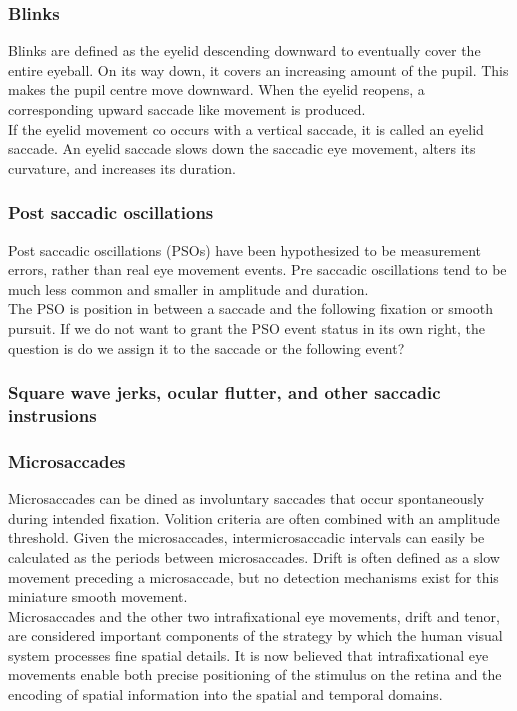 \documentclass[12pt]{article}
\theoremstyle{definition}
\begin{document}
\subsubsection{Blinks}
Blinks are defined as the eyelid descending downward to eventually cover the entire eyeball. On its way down, it covers an increasing amount of the pupil. This makes the pupil centre move downward. When the eyelid reopens, a corresponding upward saccade like movement is produced.\\

If the eyelid movement co occurs with a vertical saccade, it is called an eyelid saccade. An eyelid saccade slows down the saccadic eye movement, alters its curvature, and increases its duration. 

\subsubsection{Post saccadic oscillations}
Post saccadic oscillations (PSOs) have been hypothesized to be measurement errors, rather than real eye movement events. Pre saccadic oscillations tend to be much less common and smaller in amplitude and duration.\\

The PSO is position in between a saccade and the following fixation or smooth pursuit. If we do not want to grant the PSO event status in its own right, the question is do we assign it to the saccade or the following event?

\subsubsection{Square wave jerks, ocular flutter, and other saccadic instrusions}

\subsubsection{Microsaccades} 
Microsaccades can be dined as involuntary saccades that occur spontaneously during intended fixation. Volition criteria are often combined with an amplitude threshold. Given the microsaccades, intermicrosaccadic intervals can easily be calculated as the periods between microsaccades. Drift is often defined as a slow movement preceding a microsaccade, but no detection mechanisms exist for this miniature smooth movement.\\

Microsaccades and the other two intrafixational eye movements, drift and tenor, are considered important components of the strategy by which the human visual system processes fine spatial details. It is now believed that intrafixational eye movements enable both precise positioning of the stimulus on the retina and the encoding of spatial information into the spatial and temporal domains. 
\end{document}
